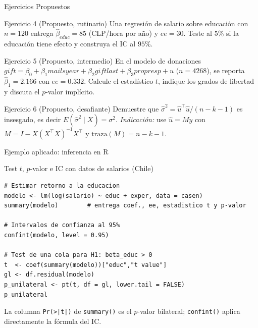 \documentclass{beamer}
\begin{document}
\begin{frame}{Ejercicios Propuestos}

\begin{block}{Ejercicio 4 (Propuesto, rutinario)}
Una regresión de salario sobre educación con $n=120$ entrega $\hat{\beta}_{educ}=85$ (CLP/hora por año) y $ee=30$. Teste al $5\%$ si la educación tiene efecto y construya el IC al $95\%$.
\end{block}

\begin{block}{Ejercicio 5 (Propuesto, intermedio)}
En el modelo de donaciones $gift=\beta_0+\beta_1 mailsyear+\beta_2 giftlast+\beta_3 propresp+u$ ($n=4268$), se reporta $\hat{\beta}_1=2.166$ con $ee=0.332$. Calcule el estadístico $t$, indique los grados de libertad y discuta el $p$-valor implícito.
\end{block}

\begin{block}{Ejercicio 6 (Propuesto, desafiante)}
Demuestre que $\hat{\sigma}^2 = \hat{u}^\top\hat{u}/(n-k-1)$ es insesgado, es decir $E(\hat{\sigma}^2\mid X)=\sigma^2$. \emph{Indicación:} use $\hat{u}=My$ con $M=I-X(X^\top X)^{-1}X^\top$ y $\text{traza}(M)=n-k-1$.
\end{block}

\end{frame}

\begin{frame}[fragile]{Ejemplo aplicado: inferencia en R}

\begin{exampleblock}{Test $t$, $p$-valor e IC con datos de salarios (Chile)}
\begin{verbatim}
# Estimar retorno a la educacion
modelo <- lm(log(salario) ~ educ + exper, data = casen)
summary(modelo)        # entrega coef., ee, estadistico t y p-valor

# Intervalos de confianza al 95%
confint(modelo, level = 0.95)

# Test de una cola para H1: beta_educ > 0
t  <- coef(summary(modelo))["educ","t value"]
gl <- df.residual(modelo)
p_unilateral <- pt(t, df = gl, lower.tail = FALSE)
p_unilateral
\end{verbatim}
\end{exampleblock}
La columna \texttt{Pr(>|t|)} de \texttt{summary()} es el $p$-valor bilateral; \texttt{confint()} aplica directamente la fórmula del IC.

\end{frame}
\end{document}
